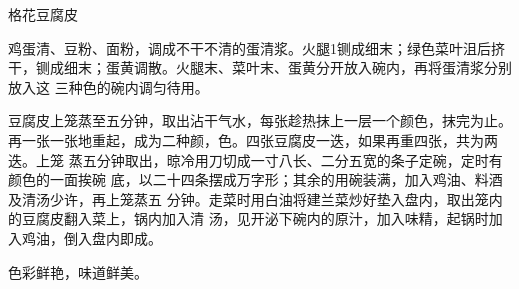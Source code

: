 \begin{recipe}{格花豆腐皮}

\ingredients


\preparation

\step 鸡蛋清、豆粉、面粉，调成不干不清的蛋清浆。火腿1铡成细末；绿色菜叶沮后挤
干，铡成细末；蛋黄调散。火腿末、菜叶末、蛋黄分开放入碗内，再将蛋清浆分别放入这
三种色的碗内调匀待用。

\step 豆腐皮上笼蒸至五分钟，取出沾干气水，每张趁热抹上一层一个颜色，抹完为止。
再一张一张地重起，成为二种颜，色。四张豆腐皮一迭，如果再重四张，共为两迭。上笼
蒸五分钟取出，晾冷用刀切成一寸八长、二分五宽的条子定碗，定时有颜色的一面挨碗
底，以二十四条摆成万字形；其余的用碗装满，加入鸡油、料酒及清汤少许，再上笼蒸五
分钟。走菜时用白油将建兰菜炒好垫入盘内，取出笼内的豆腐皮翻入菜上，锅内加入清
汤，见开泌下碗内的原汁，加入味精，起锅时加入鸡油，倒入盘内即成。

\features

色彩鲜艳，味道鲜美。

\end{recipe}

